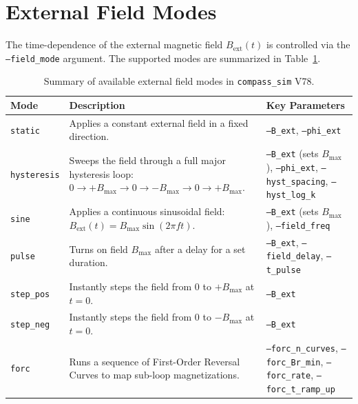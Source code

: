 \documentclass[11pt,a4paper]{article}
\newcommand{\code}[1]{\texttt{#1}}
\begin{document}
\section{External Field Modes}
\label{sec:modes}

The time-dependence of the external magnetic field $B_{\text{ext}}(t)$ is controlled via the \code{--field\_mode} argument. The supported modes are summarized in Table~\ref{tab:field_modes}.

\begin{table}[htbp]
\centering
\caption{Summary of available external field modes in \code{compass\_sim} V78.}
\label{tab:field_modes}
\vspace{1ex}
\begin{tabular}{lp{8.5cm}p{4.5cm}}
\toprule
\textbf{Mode} & \textbf{Description} & \textbf{Key Parameters} \\
\midrule
\code{static} & Applies a constant external field in a fixed direction. & \code{--B\_ext}, \code{--phi\_ext} \\
\code{hysteresis} & Sweeps the field through a full major hysteresis loop: $0 \to +B_{\max} \to 0 \to -B_{\max} \to 0 \to +B_{\max}$. & \code{--B\_ext} (sets $B_{\max}$), \code{--phi\_ext}, \code{--hyst\_spacing}, \code{--hyst\_log\_k} \\
\code{sine} & Applies a continuous sinusoidal field: $B_{\text{ext}}(t) = B_{\max}\sin(2\pi f t)$. & \code{--B\_ext} (sets $B_{\max}$), \code{--field\_freq} \\
\code{pulse} & Turns on field $B_{\max}$ after a delay for a set duration. & \code{--B\_ext}, \code{--field\_delay}, \code{--t\_pulse} \\
\code{step\_pos} & Instantly steps the field from $0$ to $+B_{\max}$ at $t = 0$. & \code{--B\_ext} \\
\code{step\_neg} & Instantly steps the field from $0$ to $-B_{\max}$ at $t = 0$. & \code{--B\_ext} \\
\code{forc} & Runs a sequence of First-Order Reversal Curves to map sub-loop magnetizations. & \code{--forc\_n\_curves}, \code{--forc\_Br\_min}, \code{--forc\_rate}, \code{--forc\_t\_ramp\_up} \\
\bottomrule
\end{tabular}
\end{table}
\end{document}
